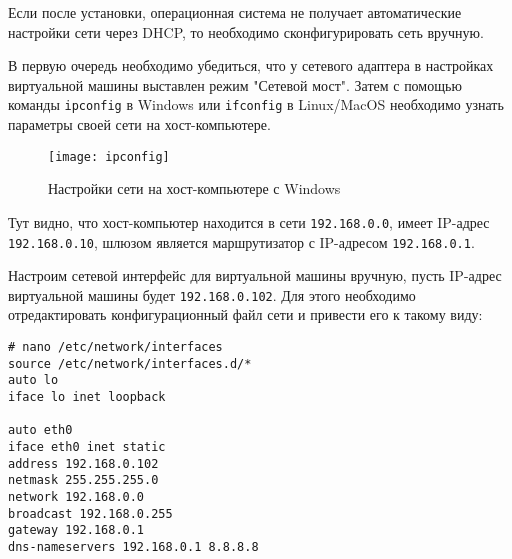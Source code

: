 \begin{figure}[ht]
    \centering
\end{figure}

\begin{figure}[ht]
    \centering
\end{figure}

\begin{figure}[ht]
    \centering
\end{figure}

\begin{figure}[ht]
    \centering
\end{figure}

\clearpage

Если после установки, операционная система не получает автоматические настройки сети через DHCP, то необходимо сконфигурировать сеть вручную.

В первую очередь необходимо убедиться, что у сетевого адаптера в настройках виртуальной машины выставлен режим "Сетевой мост".
Затем с помощью команды \texttt{ipconfig} в Windows или \texttt{ifconfig} в Linux/MacOS необходимо узнать параметры своей сети на хост-компьютере.
\begin{figure}[ht]
    \centering
    \texttt{[image: ipconfig]}
    \caption{Настройки сети на хост-компьютере с Windows}\label{pic:ipconfig}
\end{figure}

Тут видно, что хост-компьютер находится в сети \texttt{192.168.0.0}, имеет IP-адрес \texttt{192.168.0.10}, шлюзом является маршрутизатор с IP-адресом \texttt{192.168.0.1}.

Настроим сетевой интерфейс для виртуальной машины вручную, пусть IP-адрес виртуальной машины будет \texttt{192.168.0.102}.
Для этого необходимо отредактировать конфигурационный файл сети и привести его к такому виду:
\begin{lstlisting}
# nano /etc/network/interfaces
source /etc/network/interfaces.d/*
auto lo
iface lo inet loopback

auto eth0
iface eth0 inet static
address 192.168.0.102
netmask 255.255.255.0
network 192.168.0.0
broadcast 192.168.0.255
gateway 192.168.0.1
dns-nameservers 192.168.0.1 8.8.8.8
\end{lstlisting}

